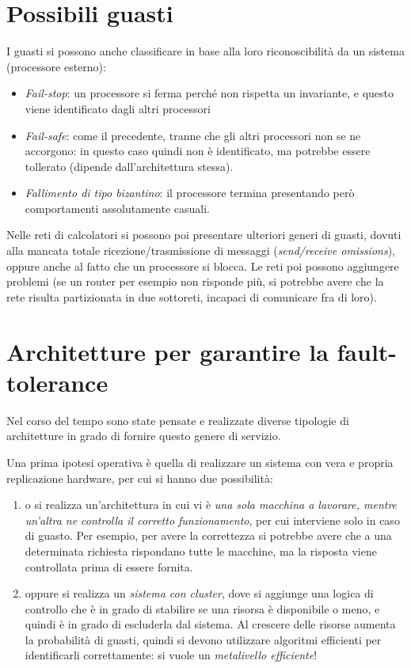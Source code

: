 \section{Possibili guasti}
I guasti si possono anche classificare in base alla loro riconoscibilità da un
sistema (processore esterno):
\begin{itemize}
 \item \textit{Fail-stop}: un processore si ferma perché non rispetta un
 invariante, e questo viene identificato dagli  altri processori
 \item \textit{Fail-safe}: come il precedente, tranne che gli altri processori
 non se ne accorgono: in questo caso quindi non è identificato, ma potrebbe
essere tollerato (dipende dall'architettura stessa).
 \item \textit{Fallimento di tipo bizantino}: il processore termina presentando
però comportamenti assolutamente casuali.
\end{itemize}
Nelle reti di calcolatori si possono poi presentare ulteriori generi di guasti,
dovuti alla mancata totale ricezione/trasmissione di messaggi
(\textit{send/receive omissions}), oppure anche al fatto che un processore si
blocca. Le reti poi possono aggiungere problemi (se un router per esempio non 
risponde più, si potrebbe avere che la
rete risulta partizionata in due sottoreti, incapaci di comunicare fra di loro).
\section{Architetture per garantire la fault-tolerance}
Nel corso del tempo sono state pensate e realizzate diverse tipologie di 
architetture in grado di fornire questo genere
di servizio.

Una prima ipotesi operativa è quella di realizzare un sistema con vera e 
propria replicazione hardware, per cui si
hanno due possibilità:
\begin{enumerate}
 \item o si realizza un'architettura in cui vi è \textit{una sola macchina a
 lavorare, mentre un'altra ne controlla il corretto  funzionamento}, per cui
 interviene solo in caso di guasto. Per esempio, per avere la correttezza si
 potrebbe  avere che a una determinata richiesta rispondano tutte le macchine,
 ma la risposta viene controllata prima di essere fornita.
 \item oppure si realizza un \textit{sistema con cluster}, dove si aggiunge una
 logica di controllo che è in grado di stabilire se una risorsa è disponibile o
 meno, e  quindi è in grado di escluderla dal sistema. Al crescere delle risorse
 aumenta la probabilità di guasti, quindi si devono utilizzare algoritmi
 efficienti per identificarli correttamente: si vuole un \textit{metalivello
 efficiente}!
\end{enumerate}

